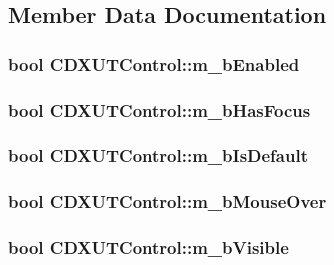 \subsection{Member Data Documentation}
\hypertarget{class_c_d_x_u_t_control_ae05508ff37757e6fcc59288f4ee08a13}{
\subsubsection[{m\_\-bEnabled}]{\setlength{\rightskip}{0pt plus 5cm}bool {\bf CDXUTControl::m\_\-bEnabled}}}
\label{class_c_d_x_u_t_control_ae05508ff37757e6fcc59288f4ee08a13}
\hypertarget{class_c_d_x_u_t_control_a635408030201d3daf9fff7d5cb1c0076}{
\subsubsection[{m\_\-bHasFocus}]{\setlength{\rightskip}{0pt plus 5cm}bool {\bf CDXUTControl::m\_\-bHasFocus}}}
\label{class_c_d_x_u_t_control_a635408030201d3daf9fff7d5cb1c0076}
\hypertarget{class_c_d_x_u_t_control_ad7553797639f844d3ad77f324d62043f}{
\subsubsection[{m\_\-bIsDefault}]{\setlength{\rightskip}{0pt plus 5cm}bool {\bf CDXUTControl::m\_\-bIsDefault}}}
\label{class_c_d_x_u_t_control_ad7553797639f844d3ad77f324d62043f}
\hypertarget{class_c_d_x_u_t_control_ab1f57181edbeedf121922db6cdc7d3ad}{
\subsubsection[{m\_\-bMouseOver}]{\setlength{\rightskip}{0pt plus 5cm}bool {\bf CDXUTControl::m\_\-bMouseOver}}}
\label{class_c_d_x_u_t_control_ab1f57181edbeedf121922db6cdc7d3ad}
\hypertarget{class_c_d_x_u_t_control_a9673eef8fa31de9e182f9a48d8b8cd16}{
\subsubsection[{m\_\-bVisible}]{\setlength{\rightskip}{0pt plus 5cm}bool {\bf CDXUTControl::m\_\-bVisible}}}
